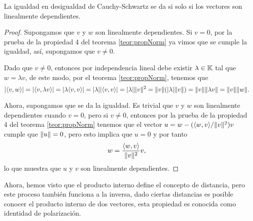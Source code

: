 \begin{coro} \label{coro:SchwartzEq}
  La igualdad en desigualdad de Cauchy-Schwartz se da si solo si los vectores son linealmente dependientes.
\end{coro}

\begin{proof}
  Supongamos que $v$ y $w$ son linealmente dependientes. Si $v = 0$, por la prueba de la propiedad 4 del teorema \ref{teor:propNorm} ya vimos que se cumple la igualdad, así, supongamos que $v \neq 0$.
  
  Dado que $v \neq 0$, entonces por independencia lineal debe existir $\lambda \in \mathbb{K}$ tal que $w = \lambda v$, de este modo, por el teorema \ref{teor:propNorm}, tenemos que
    \[
      \mathopen|\langle v,w\rangle\mathclose| = \mathopen|\langle v,\lambda v\rangle\mathclose| = \mathopen|\lambda\langle v,v\rangle\mathclose| = \mathopen|\lambda\mathclose| \mathopen|\langle v,v\rangle\mathclose| = \mathopen|\lambda\mathclose| \mathopen\|v\mathclose\|^2 = \mathopen\|v\mathclose\| (\mathopen|\lambda\mathclose| \mathopen\|v\mathclose\|) = \mathopen\|v\mathclose\| \mathopen\|\lambda v\mathclose\| = \mathopen\|v\mathclose\| \mathopen\|w\mathclose\|.
    \]
  
  Ahora, supongamos que se da la igualdad. Es trivial que $v$ y $w$ son linealmente dependientes cuando $v = 0$, pero si $v \neq 0$, entonces por la prueba de la propiedad 4 del teorema \ref{teor:propNorm} tenemos que el vector $u = w - (\langle w,v\rangle/\mathopen\|v\mathclose\|^2)v$ cumple que $\mathopen\|u\mathclose\| = 0$, pero esto implica que $u = 0$ y por tanto
    \[ w = \frac{\langle w,v\rangle}{\mathopen\|v\mathclose\|^2} v, \]
  lo que muestra que $u$ y $v$ son linealmente dependientes.
\end{proof}

Ahora, hemos visto que el producto interno define el concepto de distancia, pero este proceso también funciona a la inversa, dado ciertas distancias es posible conocer el producto interno de dos vectores, esta propiedad es conocida como identidad de polarización. 

